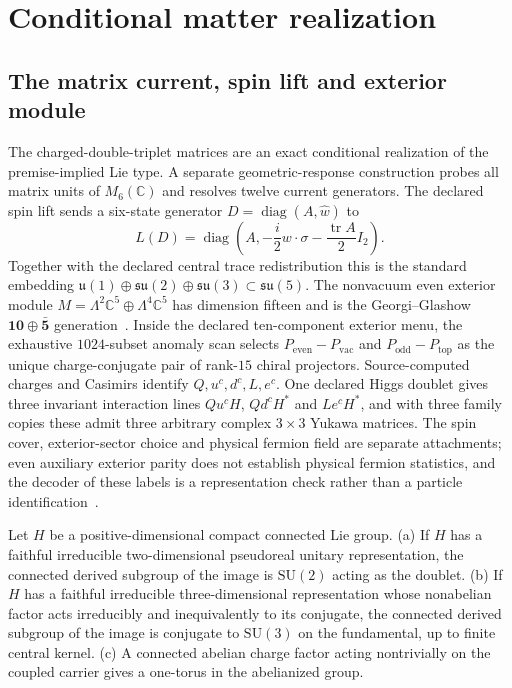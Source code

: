 \documentclass[11pt]{article}
\begin{document}
\section{Conditional matter realization}
\label{sec:matter}
\label{ass:matter-typing}

\subsection{The matrix current, spin lift and exterior module}

The charged-double-triplet matrices are an exact conditional realization of
the premise-implied Lie type. A separate geometric-response construction
probes all matrix units of \(M_6(\mathbb C)\) and resolves twelve current
generators. The declared spin lift sends a six-state generator
\(D=\operatorname{diag}(A,\widehat w)\) to
\[
L(D)=\operatorname{diag}\left(A,-\frac{i}{2}w\cdot\sigma-
\frac{\operatorname{tr}A}{2}I_2\right).
\]
Together with the declared central trace redistribution this is the standard
embedding \(\mathfrak u(1)\oplus\mathfrak{su}(2)\oplus\mathfrak{su}(3)
\subset\mathfrak{su}(5)\). The nonvacuum even exterior module
\(M=\Lambda^2\mathbb C^5\oplus\Lambda^4\mathbb C^5\) has dimension fifteen and
is the Georgi--Glashow \(\mathbf{10}\oplus\bar{\mathbf 5}\)
generation~\cite{pwgeorgi1974unity}. Inside the declared ten-component
exterior menu, the exhaustive \(1024\)-subset anomaly scan selects
\(P_{\mathrm{even}}-P_{\mathrm{vac}}\) and
\(P_{\mathrm{odd}}-P_{\mathrm{top}}\) as the unique charge-conjugate pair of
rank-\(15\) chiral projectors. Source-computed charges and Casimirs identify
\(Q,u^c,d^c,L,e^c\). One declared Higgs doublet gives three invariant
interaction lines \(Qu^cH\), \(Qd^cH^*\) and \(Le^cH^*\), and with three
family copies these admit three arbitrary complex \(3\times3\) Yukawa
matrices. The spin cover, exterior-sector choice and physical fermion field
are separate attachments; even auxiliary exterior parity does not establish
physical fermion statistics, and the decoder of these labels is a
representation check rather than a particle identification~\cite{ophparticles}.

\begin{lemma}
\label{lem:factor-identification}
Let \(H\) be a positive-dimensional compact connected Lie group.
(a) If \(H\) has a faithful irreducible two-dimensional pseudoreal unitary
representation, the connected derived subgroup of the image is
\(\mathrm{SU}(2)\) acting as the doublet. (b) If \(H\) has a faithful
irreducible three-dimensional representation whose nonabelian factor acts
irreducibly and inequivalently to its conjugate, the connected derived
subgroup of the image is conjugate to \(\mathrm{SU}(3)\) on the fundamental,
up to finite central kernel. (c) A connected abelian charge factor acting
nontrivially on the coupled carrier gives a one-torus in the abelianized
group.
\end{lemma}
\end{document}
